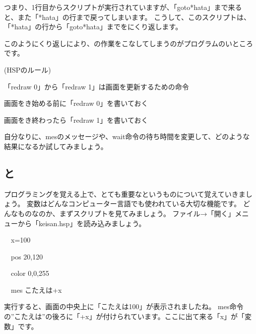 つまり、1行目からスクリプトが実行されていますが、「goto*hata」まで来ると、また「*hata」の行まで戻ってしまいます。
こうして、このスクリプトは、「*hata」の行から「goto*hata」までをにくり返します。

このようにくり返しにより、の作業をこなしてしまうのがプログラムのいところです。

\begin{description}
    \item (HSPのルール)
\end{description}

\begin{description}
    \item 「redraw 0」から「redraw 1」は画面を更新するための命令
    \item 画面をき始める前に「redraw 0」を書いておく
    \item 画面をき終わったら「redraw 1」を書いておく
\end{description}

自分なりに、mesのメッセージや、wait命令の待ち時間を変更して、どのような結果になるか試してみましょう。

\subsection{と}

プログラミングを覚える上で、とても重要なというものについて覚えていきましょう。
変数はどんなコンピューター言語でも使われている大切な機能です。
どんなものなのか、まずスクリプトを見てみましょう。
ファイル→「開く」メニューから「keisan.hsp」を読み込みましょう。

\begin{description}
    \item \ \ x=100
    \item \ \ pos 20,120
    \item \ \ color 0,0,255
    \item \ \ mes {\textquotedbl}こたえは{\textquotedbl}+x
\end{description}

実行すると、画面の中央上に「こたえは100」が表示されましたね。
mes命令の”こたえは”の後ろに「+x」が付けられています。ここに出て来る「x」が「変数」です。


